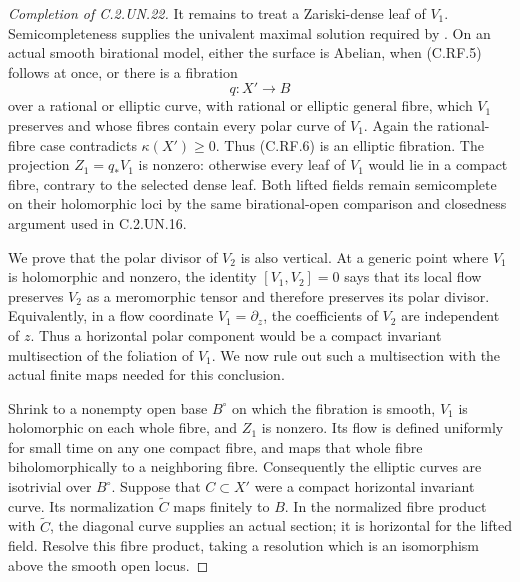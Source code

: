 \begin{proof}[Completion of C.2.UN.22]
It remains to treat a Zariski-dense leaf of $V_1$.
Semicompleteness supplies the univalent maximal solution
required by \cite[Main Theorem and the clarification immediately
following it, p.~2]{Guillot2019}. On an actual smooth
birational model, either the surface is Abelian, when
(C.RF.5) follows at once, or there is a fibration
\[
                         q:X'\longrightarrow B
                                                               \tag{C.RF.6}
\]
over a rational or elliptic curve, with rational or elliptic
general fibre, which $V_1$ preserves and whose fibres
contain every polar curve of $V_1$. Again the rational-fibre
case contradicts $\kappa(X')\ge0$. Thus (C.RF.6) is an
elliptic fibration. The projection $Z_1=q_*V_1$ is nonzero:
otherwise every leaf of $V_1$ would lie in a compact fibre,
contrary to the selected dense leaf. Both lifted fields
remain semicomplete on their holomorphic loci by the same
birational-open comparison and closedness argument used
in C.2.UN.16.

We prove that the polar divisor of $V_2$ is also vertical.
At a generic point where $V_1$ is holomorphic and nonzero,
the identity $[V_1,V_2]=0$ says that its local flow preserves
$V_2$ as a meromorphic tensor and therefore preserves its
polar divisor. Equivalently, in a flow coordinate
$V_1=\partial_z$, the coefficients of $V_2$ are independent
of $z$. Thus a horizontal polar component would be a
compact invariant multisection of the foliation of $V_1$.
We now rule out such a multisection with the actual finite
maps needed for this conclusion.

Shrink to a nonempty open base $B^\circ$ on which the
fibration is smooth, $V_1$ is holomorphic on each whole
fibre, and $Z_1$ is nonzero. Its flow is defined uniformly
for small time on any one compact fibre, and maps that
whole fibre biholomorphically to a neighboring fibre.
Consequently the elliptic curves are isotrivial over
$B^\circ$. Suppose that $C\subset X'$ were a compact
horizontal invariant curve. Its normalization $\widetilde C$
maps finitely to $B$. In the normalized fibre product with
$\widetilde C$, the diagonal curve supplies an actual
section; it is horizontal for the lifted field. Resolve
this fibre product, taking a resolution which is an
isomorphism above the smooth open locus.


\end{proof}
